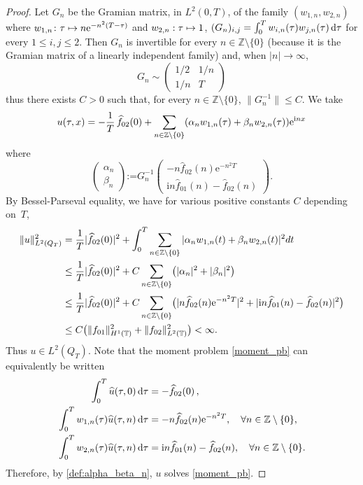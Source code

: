\documentclass[10pt]{amsart}
\def\mto{\mathchoice{\longmapsto}{\mapsto}{\mapsto}{\mapsto}}
\theoremstyle{plain}
\theoremstyle{definition}
\theoremstyle{remark}
\newcommand{\diff}[1][-3]{\ensuremath{\mathop{}\mkern#1mu\mathrm{d}}}
\newcommand{\set}{\mathbb}
\newcommand{\Z}{\set{Z}}
\newcommand{\T}{\set{T}}
\newcommand{\coloneqq}{\mathrel{\mathord{:}\mathord=}}
\newcommand{\eu}{\mathrm e}
\newcommand{\iu}{\mathrm i}
\let\originalleft\left
\let\originalright\right
\renewcommand{\left}{\mathopen{}\mathclose\bgroup\originalleft}
\renewcommand{\right}{\aftergroup\egroup\originalright}
\begin{document}
\begin{proof}
Let $G_n$ be the Gramian matrix, in $L^2(0,T)$, of the family $(w_{1,n},w_{2,n})$ where $w_{1,n}\colon\tau \mto n \eu^{-n^2(T-\tau)}$ and $w_{2,n}: \tau \mto 1$, \ie $(G_n)_{i,j}=\int_0^T w_{i,n}(\tau) w_{j,n}(\tau) \diff\tau$ for every $1 \leq i,j \leq 2$.
Then $G_n$ is invertible for every $n\in\Z\setminus\{0\}$
(because it is the Gramian matrix of a linearly independent family)
and, when $|n| \to \infty$,
\[
G_n \sim \begin{pmatrix}
1/2 & 1/n \\ 1/n & T
\end{pmatrix}
\]
thus there exists $C>0$ such that, for every $n\in\mathbb{Z} \setminus\{0\}$, $\| G_n^{-1} \| \leq C$. We take
\[
u(\tau,x)= - \frac{1}{T}\, \widehat{f}_{02}(0) + \sum_{n\in\mathbb{Z}\setminus\{0\}} \left(\alpha_n w_{1,n}(\tau) + \beta_n w_{2,n}(\tau) \right) \eu^{\iu nx}
\]
where
\begin{equation} \label{def:alpha_beta_n}
\begin{pmatrix} \alpha_n \\ \beta_n \end{pmatrix}\coloneqq G_n^{-1}
\begin{pmatrix}
-n \widehat{f}_{02}(n) \eu^{-n^2 T}
\\
\iu n \widehat{f}_{01}(n) - \widehat{f}_{02}(n)
\end{pmatrix}.
\end{equation}
By Bessel-Parseval equality, we have for various positive constants $C$ depending on~$T$,
\begin{align*}
\|u\|_{L^2(Q_T)}^2
& =\frac{1}{T} |\widehat{f}_{02}(0)|^2 + \int_0^T \sum_{n\in\Z\setminus\{0\}}| \alpha_n w_{1,n}(t) + \beta_n w_{2,n}(t) |^2 dt \\
& \leq \frac{1}{T} |\widehat{f}_{02}(0)|^2 + C\sum_{n\in\Z\setminus\{0\}} \left(|\alpha_n|^2 + |\beta_n|^2 \right) \\
& \leq \frac{1}{T} |\widehat{f}_{02}(0)|^2 + C \sum_{n\in\Z\setminus\{0\}} \bigl(|n \widehat{f}_{02}(n) \eu^{-n^2 T}|^2 + |\iu n \widehat{f}_{01}(n) - \widehat{f}_{02}(n)|^2 \bigr) \\
& \leq C \bigl(\|f_{01}\|_{H^1(\T)}^2 + \|f_{02}\|_{L^2(\T)}^2 \bigr) < \infty.
\end{align*}
Thus $u\in L^2(Q_T)$. Note that the moment problem \eqref{moment_pb}
can equivalently be written
\begin{equation} \label{moment_pb_bis}
\begin{split}
\int_0^T \widehat{u}(\tau,0) \diff \tau&=- \widehat{f}_{02}(0)\,, \\
\int_0^T w_{1,n}(\tau) \widehat{u}(\tau,n) \diff \tau&=- n \widehat{f}_{02}(n) \eu^{-n^2 T}, \quad \forall n \in \mathbb{Z}\setminus\{0\}, \\
\int_0^T w_{2,n}(\tau) \widehat{u}(\tau,n) \diff \tau &= \iu n \widehat{f}_{01}(n) - \widehat{f}_{02}(n), \quad \forall n \in \mathbb{Z}\setminus\{0\}.
\end{split}
\end{equation}
Therefore, by \eqref{def:alpha_beta_n}, $u$ solves \eqref{moment_pb}.
\end{proof}
\end{document}
